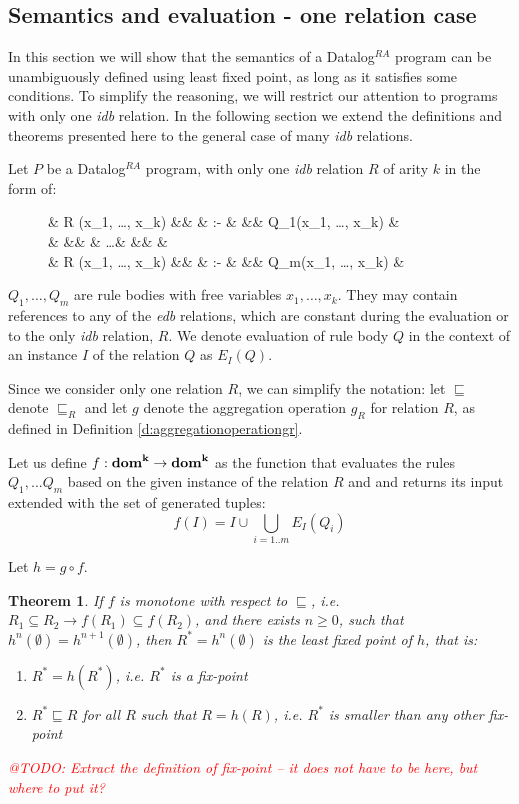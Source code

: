 \documentclass{pracamgr}
\makeatletter
\theoremstyle{plain}
\newtheorem{thm}{Theorem}[section]
\theoremstyle{definition}
\theoremstyle{remark}
\newcommand{\todo}[1]{\textcolor{red}{@TODO: #1}}
\newcommand{\datalogra}{Datalog$^{RA}$ }
\newcommand{\narrow}[1]{\begin{changemargin}{2cm}{2cm} #1 \end{changemargin}}
\makeatother
\begin{document}
\subsection{Semantics and evaluation - one relation case}\label{ss:semeval1rel}
In this section we will show that the semantics of a \datalogra program can be unambiguously defined using least fixed point, as long as it satisfies some conditions. To simplify the reasoning, we will restrict our attention to programs with only one \emph{idb} relation. In the following section we extend the definitions and theorems presented here to the general case of many \emph{idb} relations.

Let $P$ be a \datalogra program, with only one \emph{idb} relation $R$ of arity $k$ in the form of:

\begin{figure}[h!]
\narrow{
  \begin{flalign*}
  & \textsc{R} (x_1, \dots, x_k) &&  & :- & && Q_1(x_1, \dots, x_k) & \\
  &  &&  & \dots & && & \\
  & \textsc{R} (x_1, \dots, x_k) &&  & :- & && Q_m(x_1, \dots, x_k) & \\
  \end{flalign*}
}
\end{figure}

$Q_1, \dots, Q_m$ are rule bodies with free variables $x_1, \dots, x_k$. They may contain references to any of the \emph{edb} relations, which are constant during the evaluation or to the only \emph{idb} relation, $R$. We denote evaluation of rule body $Q$ in the context of an instance $I$ of the relation $Q$ as $E_I(Q)$.

Since we consider only one relation $R$, we can simplify the notation: let $\sqsubseteq$ denote $\sqsubseteq_R$ and let $g$ denote the aggregation operation $g_R$ for relation $R$, as defined in Definition \ref{d:aggregationoperationgr}.

Let us define $f: \bf{dom}^k \to \bf{dom}^k$ as the function that evaluates the rules $Q_1, ... Q_m$ based on the given instance of the relation $R$ and and returns its input extended with the set of generated tuples:
$$ f(I) = I \cup \bigcup_{i=1..m} E_I(Q_i) $$

Let $h = g \circ f$. 


\begin{thm}
If $f$ is monotone with respect to $\sqsubseteq$, i.e. $R_1 \subseteq R_2 \rightarrow f(R_1) \subseteq f(R_2)$, and there exists $n \ge 0 $, such that $h^n(\emptyset) = h^{n+1}(\emptyset)$, then $R^* = h^n(\emptyset)$ is the least fixed point of $h$, that is:
\begin{enumerate}
\item $R^* = h(R^*)$, i.e. $R^*$ is a fix-point
\item $R^* \sqsubseteq R$ for all $R$ such that $R = h(R)$, i.e. $R^*$ is smaller than any other fix-point
\end{enumerate}
\todo{Extract the definition of fix-point -- it does not have to be here, but where to put it?}
\end{thm}
\end{document}
